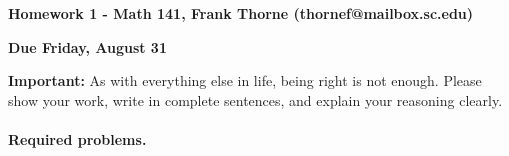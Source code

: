 \documentclass[12pt]{article}
\begin{document}
\setlength{\topmargin}{-2mm}





\begin{center}{\bf Homework 1 - Math 141, Frank Thorne (thornef@mailbox.sc.edu)}
\end{center}
\begin{center}
{\bf Due Friday, August 31}
\end{center}

{\bf Important:} As with everything else in life, being right is not enough.
Please show your work, write in complete sentences, and explain your reasoning clearly. 
\\
\\
{\bf Required problems.}
\end{document}
